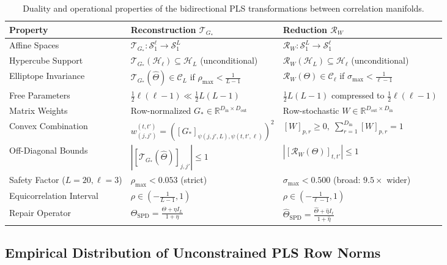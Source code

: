 \documentclass[default,sn-mathphys,Numbered]{sn-jnl}
\theoremstyle{thmstyleone}
\theoremstyle{thmstylethree}
\theoremstyle{thmstyletwo}
\newcommand{\inp}{\text{in}}
\newcommand{\outp}{\text{out}}
\begin{document}
\begin{appendices}
\begin{table}[htbp]
\caption{Duality and operational properties of the bidirectional PLS transformations between correlation manifolds.}
\label{tab:operator_comparison}
\small
\begin{tabularx}{\textwidth}{lXX}
\toprule
\textbf{Property} & \textbf{Reconstruction $\mathcal{T}_{G_*}$} & \textbf{Reduction $\mathcal{R}_W$} \\
\midrule
Affine Spaces & $\mathcal{T}_{G_*} : \mathcal{S}_1^\ell \to \mathcal{S}_1^L$ & $\mathcal{R}_W : \mathcal{S}_1^L \to \mathcal{S}_1^\ell$ \\
Hypercube Support & $\mathcal{T}_{G_*}(\mathcal{H}_\ell) \subseteq \mathcal{H}_L$ (unconditional) & $\mathcal{R}_W(\mathcal{H}_L) \subseteq \mathcal{H}_\ell$ (unconditional) \\
Elliptope Invariance & $\mathcal{T}_{G_*}(\hat{\Theta}) \in \mathcal{C}_L$ if $\rho_{\max} < \frac{1}{L-1}$ & $\mathcal{R}_W(\Theta) \in \mathcal{C}_\ell$ if $\sigma_{\max} < \frac{1}{\ell-1}$ \\
Free Parameters & $\frac{1}{2}\ell(\ell-1) \ll \frac{1}{2}L(L-1)$ & $\frac{1}{2}L(L-1)$ compressed to $\frac{1}{2}\ell(\ell-1)$ \\
Matrix Weights & Row-normalized $G_* \in \mathbb{R}^{D_{\inp} \times D_{\outp}}$ & Row-stochastic $W \in \mathbb{R}^{D_{\outp} \times D_{\inp}}$ \\
Convex Combination & $w_{(j,j')}^{(t,t')} = ([G_*]_{\psi(j,j',L), \psi(t,t',\ell)})^2$ & $[W]_{p, r} \ge 0, \;\sum_{r=1}^{D_{\inp}} [W]_{p, r} = 1$ \\
Off-Diagonal Bounds & $|[\mathcal{T}_{G_*}(\hat{\Theta})]_{j, j'}| \le 1$ & $|[\mathcal{R}_W(\Theta)]_{t, t'}| \le 1$ \\
Safety Factor ($L=20, \ell=3$) & $\rho_{\max} < 0.053$ (strict) & $\sigma_{\max} < 0.500$ (broad: $9.5\times$ wider) \\
Equicorrelation Interval & $\rho \in \left(-\frac{1}{L-1}, 1\right)$ & $\rho \in \left(-\frac{1}{\ell-1}, 1\right)$ \\
Repair Operator & $\Theta_{\mathrm{SPD}} = \frac{\Theta + \eta I_L}{1 + \eta}$ & $\hat{\Theta}_{\mathrm{SPD}} = \frac{\hat{\Theta} + \hat{\eta} I_\ell}{1 + \hat{\eta}}$ \\
\bottomrule
\end{tabularx}
\end{table}

\subsection{Empirical Distribution of Unconstrained PLS Row Norms}
\label{subsec:app_row_norms}


\end{appendices}
\end{document}
